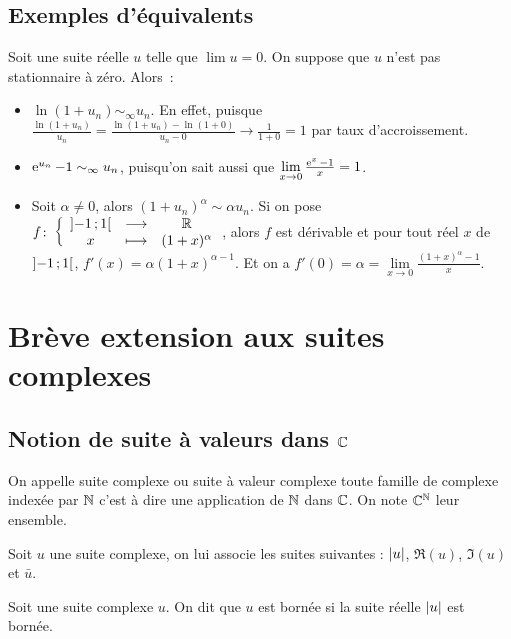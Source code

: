 \subsection{Exemples d'équivalents}

Soit une suite réelle \(u\) telle que \(\lim u = 0\). On suppose que 
\(u\) n'est pas stationnaire à zéro. Alors~:
\begin{itemize}
    \item \(\ln(1+u_n) \sim_\infty u_n\). En effet, puisque 
        \(\frac{\ln(1+u_n)}{u_n}= \frac{\ln(1+u_n) - \ln(1+0)}{u_n-0} \to 
    \frac{1}{1+0} =1\) par taux d'accroissement.  \item \(\operatorname{e}^{u_n}-1 
        \sim_\infty u_n\), puisqu'on sait aussi que \(\lim\limits_{x \to 
        0} \frac{\operatorname{e}^{x}-1}{x} = 1\).
    \item Soit \(\alpha \neq 0\), alors \((1+u_n)^\alpha \sim \alpha 
        u_n\). Si on pose 
        \(f\colon \left\{\begin{array}{ccc} \left] -1 \, ;  1 \right[ & \longrightarrow &\mathbb{R}\\ x & \longmapsto & (1+x)^\alpha \end{array} \right.\), alors 
        \(f\) est dérivable et pour tout réel \(x\) de 
        \(\left] -1 \, ;  1 \right[\), \(f'(x) = \alpha(1+x)^{\alpha -1}\). Et 
        on a \(f'(0) = \alpha = \lim\limits_{x \to 
        0}\frac{(1+x)^\alpha-1}{x}\).
\end{itemize}

\section{Brève extension aux suites complexes}

\subsection{Notion de suite à valeurs dans \(\mathbb{C}\)}

\begin{defdef}
    On appelle suite complexe ou suite à valeur complexe toute famille 
    de complexe indexée par \(\mathbb{N}\) c'est à dire une application de 
    \(\mathbb{N}\) dans \(\mathbb{C}\). On note \(\mathbb{C}^{\mathbb{N}}\) leur ensemble.
\end{defdef}
\begin{defdef}
    Soit \(u\) une suite complexe, on lui associe les suites suivantes : 
    \(\left\lvert u\right\rvert\), \(\Re(u)\), \(\Im(u)\) et \(\bar{u}\).
\end{defdef}
\begin{defdef}
    Soit une suite complexe \(u\). On dit que \(u\) est bornée si la 
    suite réelle \(\left\lvert u\right\rvert\) est bornée.
\end{defdef}

